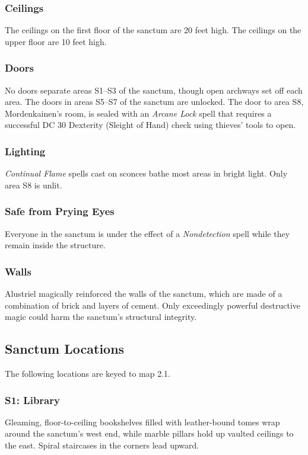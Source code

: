 \documentclass[10pt,a4paper,twoside,bg=print,twocolumn,openany,nodeprecatedcode]{dndbook}
\begin{document}
\subsubsection{Ceilings}
The ceilings on the first floor of the sanctum are 20 feet high. The ceilings on the upper floor are 10 feet high.

\subsubsection{Doors}
No doors separate areas S1–S3 of the sanctum, though open archways set off each area. The doors in areas S5–S7 of the sanctum are unlocked. The door to area S8, Mordenkainen's room, is sealed with an \textit{Arcane Lock} spell that requires a successful DC 30 Dexterity (Sleight of Hand) check using thieves' tools to open.

\subsubsection{Lighting}
\textit{Continual Flame} spells cast on sconces bathe most areas in bright light. Only area S8 is unlit.

\subsubsection{Safe from Prying Eyes}
Everyone in the sanctum is under the effect of a \textit{Nondetection} spell while they remain inside the structure.

\subsubsection{Walls}
Alustriel magically reinforced the walls of the sanctum, which are made of a combination of brick and layers of cement. Only exceedingly powerful destructive magic could harm the sanctum's structural integrity.

\subsection{Sanctum Locations}
The following locations are keyed to map 2.1.

\subsubsection{S1: Library}
\begin{DndReadAloud}{}
Gleaming, floor-to-ceiling bookshelves filled with leather-bound tomes wrap around the sanctum's west end, while marble pillars hold up vaulted ceilings to the east. Spiral staircases in the corners lead upward.

\end{DndReadAloud}
\end{document}
